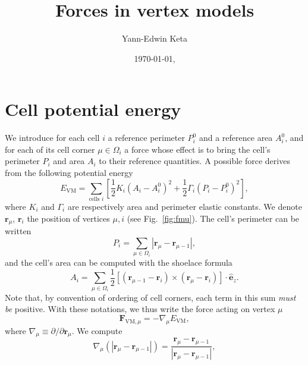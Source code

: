 \documentclass[aps, superscriptaddress, notitlepage, longbibliography]{revtex4-1}
\begin{document}

\title{Forces in vertex models}
\author{Yann-Edwin Keta}
\date{\today, \currenttime}
\maketitle


\section{Cell potential energy}

We introduce for each cell $i$ a reference perimeter $P^0_i$ and a reference area $A^0_i$, and for each of its cell corner $\mu \in \Omega_i$ a force whose effect is to bring the cell's perimeter $P_i$ and area $A_i$ to their reference quantities. A possible force derives from the following potential energy \cite{farhadifar2007influence,fletcher2014vertex,bi2016motilitydriven,sknepnek2023generating}
\begin{equation}
E_{\mathrm{VM}} = \sum_{\text{cells } i} \left[\frac{1}{2} K_i (A_i - A_i^0)^2 + \frac{1}{2} \Gamma_i (P_i - P_i^0)^2\right],
\label{eq:evm}
\end{equation}
where $K_i$ and $\Gamma_i$ are respectively area and perimeter elastic constants. We denote $\boldsymbol{r}_{\mu}$, $\boldsymbol{r}_i$ the position of vertices $\mu, i$ (see Fig.~\ref{fig:fmu}). The cell's perimeter can be written
\begin{equation}
P_i = \sum_{\mu \in \Omega_i} |\boldsymbol{r}_{\mu} - \boldsymbol{r}_{\mu - 1}|,
\end{equation}
and the cell's area can be computed with the shoelace formula
\begin{equation}
A_i = \sum_{\mu \in \Omega_i} \frac{1}{2} [(\boldsymbol{r}_{\mu - 1} - \boldsymbol{r}_{i}) \times (\boldsymbol{r}_{\mu} - \boldsymbol{r}_{i})] \cdot \hat{\boldsymbol{e}}_z.
\end{equation}
Note that, by convention of ordering of cell corners, each term in this sum \textit{must be} positive. With these notations, we thus write the force acting on vertex $\mu$
\begin{equation}
\boldsymbol{F}_{\mathrm{VM},\mu} = -\nabla_{\mu} E_{\mathrm{VM}},
\label{eq:fmugrade}
\end{equation}
where $\nabla_{\mu} \equiv \partial/\partial \boldsymbol{r}_{\mu}$. We compute
\begin{equation}
\nabla_{\mu} \left(|\boldsymbol{r}_{\mu} - \boldsymbol{r}_{\mu - 1}|\right) = \frac{\boldsymbol{r}_{\mu} - \boldsymbol{r}_{\mu - 1}}{|\boldsymbol{r}_{\mu} - \boldsymbol{r}_{\mu - 1}|},
\end{equation}
\end{document}
